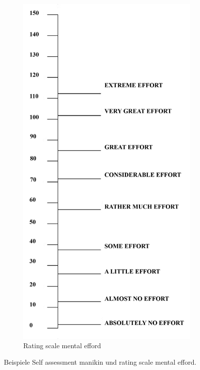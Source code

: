\begin{figure}
\begin{subfigure}{0.25\textwidth}
		\includegraphics[width=\textwidth]{./images/rsme.png}
		\caption{Rating scale mental efford}
		\label{fig:rsme_questionnaire}
	\end{subfigure}
	\caption{Beispiele Self assessment manikin und rating scale mental efford.}
\end{figure}

